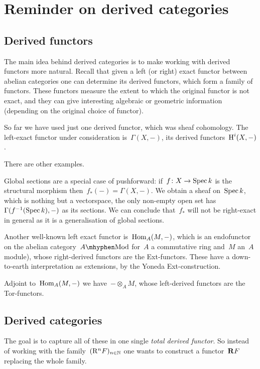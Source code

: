 \setcounter{section}{-1}
\section{Reminder on derived categories}
\label{section:derived-categories}
\subsection{Derived functors}
The main idea behind derived categories is to make working with derived functors more natural. Recall that given a left (or right) exact functor between abelian categories one can determine its derived functors, which form a family of functors. These functors measure the extent to which the original functor is not exact, and they can give interesting algebraic or geometric information (depending on the original choice of functor).

\begin{example}
  So far we have used just one derived functor, which was sheaf cohomology. The left-exact functor under consideration is~$\Gamma(X,-)$, its derived functors~$\operatorname{H}^i(X,-)$.
\end{example}

There are other examples.
\begin{example}
  \label{example:global-sections-pushforward}
  Global sections are a special case of pushforward: if~$f\colon X\to\operatorname{Spec} k$ is the structural morphism then~$f_*(-)=\Gamma(X,-)$. We obtain a sheaf on~$\operatorname{Spec} k$, which is nothing but a vectorspace, the only non-empty open set has~$\Gamma(f^{-1}(\operatorname{Spec} k),-)$ as its sections. We can conclude that~$f_*$ will not be right-exact in general as it is a generalisation of global sections.
\end{example}
\begin{example}
  Another well-known left exact functor is~$\operatorname{Hom}_A(M,-)$, which is an endofunctor on the abelian category~$A\mhyphen\mathrm{Mod}$ for~$A$ a commutative ring and~$M$ an~$A$\dash module), whose right-derived functors are the Ext-functors. These have a down-to-earth interpretation as extensions, by the Yoneda Ext-construction.
\end{example}
\begin{example}
  Adjoint to~$\operatorname{Hom}_A(M,-)$ we have~$-\otimes_AM$, whose left-derived functors are the Tor-functors.
\end{example}

\subsection{Derived categories}
The goal is to capture all of these in one single \emph{total derived functor}. So instead of working with the family~$(\mathrm{R}^nF)_{n\in\mathbb{N}}$ one wants to construct a functor~$\mathbf{R} F$ replacing the whole family.

